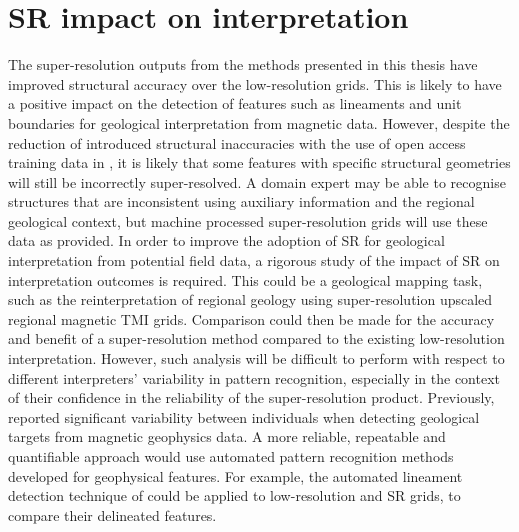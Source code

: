 \section{SR impact on interpretation}
The super-resolution outputs from the methods presented in this thesis have improved structural accuracy over the low-resolution grids.
This is likely to have a positive impact on the detection of features such as lineaments and unit boundaries for geological interpretation from magnetic data.
However, despite the reduction of introduced structural inaccuracies with the use of open access training data in , it is likely that some features with specific structural geometries will still be incorrectly super-resolved.
A domain expert may be able to recognise structures that are inconsistent using auxiliary information and the regional geological context, but machine processed super-resolution grids will use these data as provided.
In order to improve the adoption of SR for geological interpretation from potential field data, a rigorous study of the impact of SR on interpretation outcomes is required.
This could be a geological mapping task, such as the reinterpretation of regional geology using super-resolution upscaled regional magnetic TMI grids.
Comparison could then be made for the accuracy and benefit of a super-resolution method compared to the existing low-resolution interpretation.
However, such analysis will be difficult to perform with respect to different interpreters' variability in pattern recognition, especially in the context of their confidence in the reliability of the super-resolution product.
Previously, \textcite{sivarajahIdentifyingEffectiveInterpretation2013} reported significant variability between individuals when detecting geological targets from magnetic geophysics data.
A more reliable, repeatable and quantifiable approach would use automated pattern recognition methods developed for geophysical features.
For example, the automated lineament detection technique of \textcite{holdenAutomaticIdentificationResponses2011,holdenAutomatedAnalysisRegional2008} could be applied to low-resolution and SR grids, to compare their delineated features.

